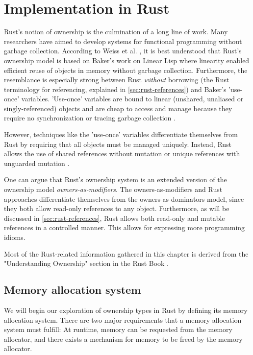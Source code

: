 \documentclass[sigplan,11pt,nonacm]{acmart}
\begin{document}
\section{Implementation in Rust}
\label{sec:implementation-in-rust}

Rust's notion of ownership is the culmination of a long line of work.
Many researchers have aimed to develop systems for functional programming without garbage collection.
According to Weiss et al. \cite{oxide}, it is best understood that Rust's ownership model is based on Baker's work on Linear Lisp \cite{linear-lisp} where linearity enabled efficient reuse of objects in memory without garbage collection.
Furthermore, the resemblance is especially strong between Rust \emph{without} borrowing (the Rust terminology for referencing, explained in \ref{sec:rust-references}) and Baker's 'use-once' variables.
'Use-once' variables are bound to linear (unshared, unaliased or singly-referenced) objects and are cheap to access and manage because they require no synchronization or tracing garbage collection \cite{use-once}.

However, techniques like the 'use-once' variables differentiate themselves from Rust by requiring that all objects must be managed uniquely.
Instead, Rust allows the use of shared references without mutation or unique references with unguarded mutation \cite{oxide}.

One can argue that Rust's ownership system is an extended version of the ownership model \emph{owners-as-modifiers}.
The owners-as-modifiers and Rust approaches differentiate themselves from the owners-as-dominators model, since they both allow read-only references to any object.
Furthermore, as will be discussed in \ref{sec:rust-references}, Rust allows both read-only and mutable references in a controlled manner.
This allows for expressing more programming idioms.

Most of the Rust-related information gathered in this chapter is derived from the "Understanding Ownership" section in the Rust Book \cite{rust-book}.


\subsection{Memory allocation system}
\label{sec:memory-allocation}

We will begin our exploration of ownership types in Rust by defining its memory allocation system.
There are two major requirements that a memory allocation system must fulfill:
At runtime, memory can be requested from the memory allocator, and there exists a mechanism for memory to be freed by the memory allocator.
\end{document}

